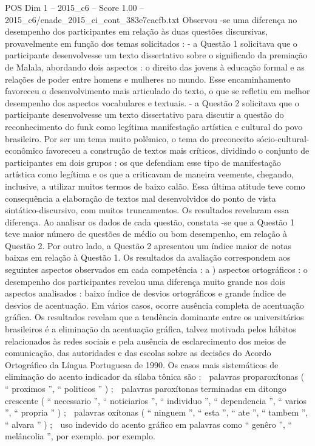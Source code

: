 \begin{textsample}{POS Dim 1 – 2015\_c6 – Score 1.00 – 2015\_c6/enade\_2015\_ci\_cont\_383e7cacfb.txt}
Observou -se uma diferença no desempenho dos participantes em relação às duas questões discursivas, provavelmente em função dos temas solicitados : - a Questão 1 solicitava que o participante desenvolvesse um texto dissertativo sobre o significado da premiação de Malala, abordando dois aspectos : o direito das jovens à educação formal e as relações de poder entre homens e mulheres no mundo.
Esse encaminhamento favoreceu o desenvolvimento mais articulado do texto, o que se refletiu em melhor desempenho dos aspectos vocabulares e textuais. - a Questão 2 solicitava que o participante desenvolvesse um texto dissertativo para discutir a questão do reconhecimento do funk como legítima manifestação artística e cultural do povo brasileiro.
Por ser um tema muito polêmico, o tema do preconceito sócio-cultural-econômico favoreceu a construção de textos mais críticos, dividindo o conjunto de participantes em dois grupos : os que defendiam esse tipo de manifestação artística como legítima e os que a criticavam de maneira veemente, chegando, inclusive, a utilizar muitos termos de baixo calão.
Essa última atitude teve como consequência a elaboração de textos mal desenvolvidos do ponto de vista sintático-discursivo, com muitos truncamentos.
Os resultados revelaram essa diferença.
Ao analisar os dados de cada questão, constata -se que a Questão 1 teve maior número de questões de médio ou bom desempenho, em relação à Questão 2.
Por outro lado, a Questão 2 apresentou um índice maior de notas baixas em relação à Questão 1.
Os resultados da avaliação correspondem aos seguintes aspectos observados em cada competência : a ) aspectos ortográficos : o desempenho dos participantes revelou uma diferença muito grande nos dois aspectos analisados : baixo índice de desvios ortográficos e grande índice de desvios de acentuação.
Em vários casos, ocorre ausência completa de acentuação gráfica.
Os resultados revelam que a tendência dominante entre os universitários brasileiros é a eliminação da acentuação gráfica, talvez motivada pelos hábitos relacionados às redes sociais e pela ausência de esclarecimento dos meios de comunicação, das autoridades e das escolas sobre as decisões do Acordo Ortográfico da Língua Portuguesa de 1990.
Os casos mais sistemáticos de eliminação do acento indicador da sílaba tônica são :  palavras proparoxítonas ( “ proximos ”, “ politicos ” ) ;  palavras paroxítonas terminadas em ditongo crescente ( “ necessario ”, “ noticiarios ”, “ individuo ”, “ dependencia ”, “ varios ”, “ propria ” ) ;  palavras oxítonas ( “ ninguem ”, “ esta ”, “ ate ”, “ tambem ”, “ alvara ” ) ;  uso indevido do acento gráfico em palavras como “ genêro ”, “ melâncolia ”, por exemplo. por exemplo.

\end{textsample}
